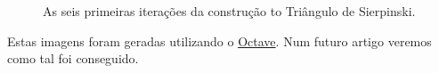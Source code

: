 \documentclass[11pt]{article}
\begin{document}
\begin{figure}[H]
  \centering



  \caption{As seis primeiras iterações da construção to Triângulo de
    Sierpinski.}
\end{figure}

Estas imagens foram geradas utilizando o
\href{http://www.gnu.org/software/octave/}{Octave}. Num futuro artigo
veremos como tal foi conseguido.
  
\end{document}
